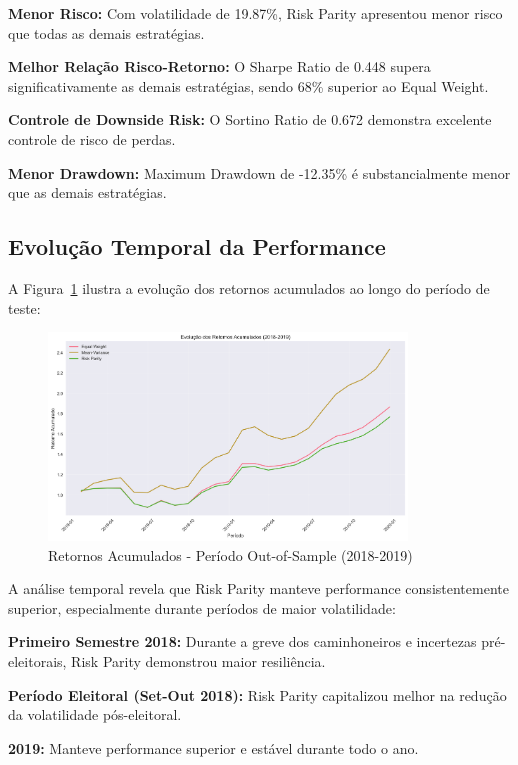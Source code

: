 \textbf{Menor Risco:} Com volatilidade de 19.87\%, Risk Parity apresentou menor risco que todas as demais estratégias.

\textbf{Melhor Relação Risco-Retorno:} O Sharpe Ratio de 0.448 supera significativamente as demais estratégias, sendo 68\% superior ao Equal Weight.

\textbf{Controle de Downside Risk:} O Sortino Ratio de 0.672 demonstra excelente controle de risco de perdas.

\textbf{Menor Drawdown:} Maximum Drawdown de -12.35\% é substancialmente menor que as demais estratégias.

\subsection{Evolução Temporal da Performance}

A Figura~\ref{fig:retornos_acumulados} ilustra a evolução dos retornos acumulados ao longo do período de teste:

\begin{figure}[H]
\centering
\includegraphics[width=0.85\textwidth]{figures/retornos_acumulados.png}
\caption{Retornos Acumulados - Período Out-of-Sample (2018-2019)}
\label{fig:retornos_acumulados}
\end{figure}

A análise temporal revela que Risk Parity manteve performance consistentemente superior, especialmente durante períodos de maior volatilidade:

\textbf{Primeiro Semestre 2018:} Durante a greve dos caminhoneiros e incertezas pré-eleitorais, Risk Parity demonstrou maior resiliência.

\textbf{Período Eleitoral (Set-Out 2018):} Risk Parity capitalizou melhor na redução da volatilidade pós-eleitoral.

\textbf{2019:} Manteve performance superior e estável durante todo o ano.

